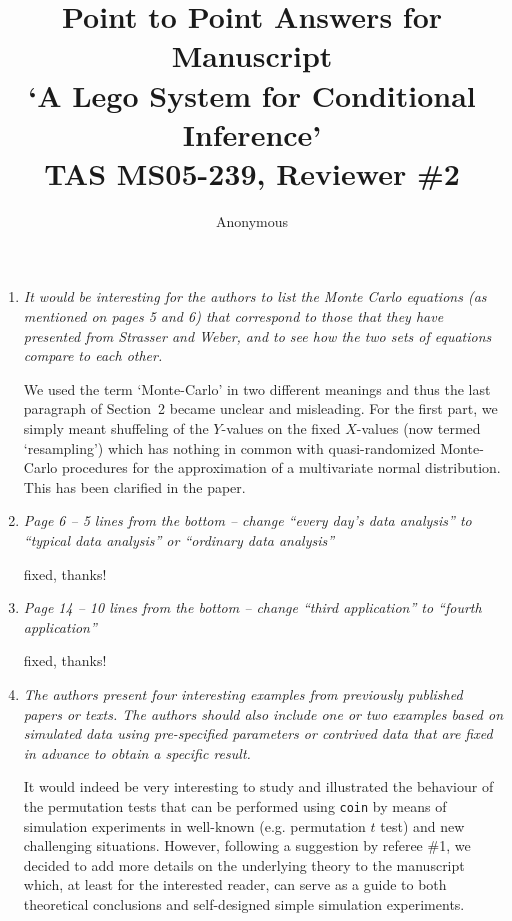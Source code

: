 \documentclass[11pt]{article}
\begin{document}
\title{Point to Point Answers for Manuscript \\
`A Lego System for Conditional Inference' \\
TAS MS05-239, Reviewer \#2}
\author{Anonymous}
\maketitle

\begin{enumerate}

\item \textsl{It would be interesting for the authors to list the Monte Carlo equations
              (as mentioned on pages 5 and 6) that correspond to those that they have 
              presented from Strasser and Weber, and to see how the two sets of equations 
              compare to each other.}

We used the term `Monte-Carlo' in two different meanings and thus the last
paragraph of Section~2 became unclear and misleading. For the first part, we
simply meant shuffeling of the $Y$-values on the fixed $X$-values (now
termed `resampling') which has nothing in common with quasi-randomized
Monte-Carlo procedures for the approximation of a multivariate normal
distribution. This has been clarified in the paper.

\item \textsl{Page 6 – 5 lines from the bottom – change “every day’s data analysis” to
              “typical data analysis” or “ordinary data analysis”}

fixed, thanks!

\item \textsl{Page 14 – 10 lines from the bottom – change “third application” to
              “fourth application”}

fixed, thanks!

\item \textsl{The authors present four interesting examples from previously published
              papers or texts. The authors should also include one or two examples 
              based on simulated data using pre-specified
              parameters or contrived data that are fixed in advance to obtain a specific
              result.}

It would indeed be very interesting to study and illustrated the behaviour of the
permutation tests that can be performed using \texttt{coin} by means of
simulation experiments in well-known (e.g. permutation $t$ test) and new
challenging situations. However, following a suggestion by referee \#1, we
decided to add more details on the underlying theory to the manuscript
which, at least for the interested reader, can serve as a guide to both
theoretical conclusions and self-designed simple simulation experiments. 


\end{enumerate}
\end{document}
